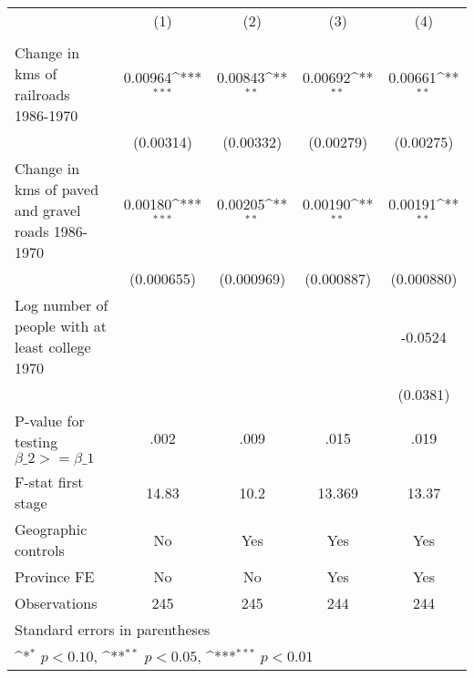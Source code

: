 {
\def\sym#1{\ifmmode^{#1}\else\(^{#1}\)\fi}
\begin{tabular}{l*{4}{c}}
\hline\hline
                &\multicolumn{1}{c}{(1)}&\multicolumn{1}{c}{(2)}&\multicolumn{1}{c}{(3)}&\multicolumn{1}{c}{(4)}\\
                &\multicolumn{1}{c}{}&\multicolumn{1}{c}{}&\multicolumn{1}{c}{}&\multicolumn{1}{c}{}\\
\hline
Change in kms of railroads 1986-1970&  0.00964\sym{***}&  0.00843\sym{**} &  0.00692\sym{**} &  0.00661\sym{**} \\
                &(0.00314)         &(0.00332)         &(0.00279)         &(0.00275)         \\
[1em]
Change in kms of paved and gravel roads 1986-1970&  0.00180\sym{***}&  0.00205\sym{**} &  0.00190\sym{**} &  0.00191\sym{**} \\
                &(0.000655)         &(0.000969)         &(0.000887)         &(0.000880)         \\
[1em]
Log number of people with at least college 1970&                  &                  &                  &  -0.0524         \\
                &                  &                  &                  & (0.0381)         \\
\hline
P-value for testing $\beta\_{2} >= \beta\_{1}$&     .002         &     .009         &     .015         &     .019         \\
F-stat first stage&    14.83         &     10.2         &   13.369         &    13.37         \\
Geographic controls&       No         &      Yes         &      Yes         &      Yes         \\
Province FE     &       No         &       No         &      Yes         &      Yes         \\
Observations    &      245         &      245         &      244         &      244         \\
\hline\hline
\multicolumn{5}{l}{\footnotesize Standard errors in parentheses}\\
\multicolumn{5}{l}{\footnotesize \sym{*} \(p<0.10\), \sym{**} \(p<0.05\), \sym{***} \(p<0.01\)}\\
\end{tabular}
}
